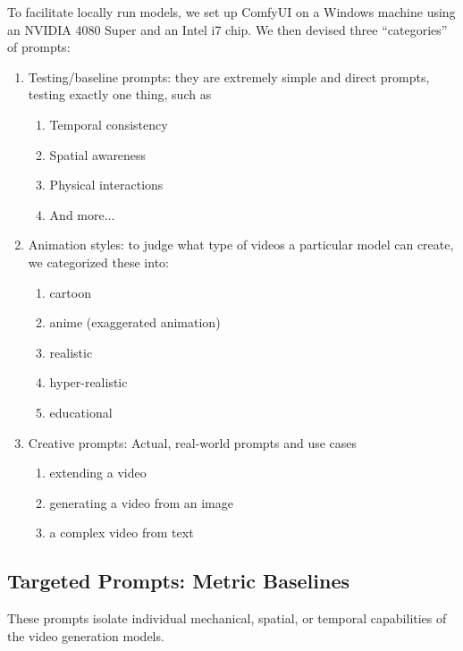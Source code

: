 \documentclass[sigconf]{acmart}
\begin{document}
To facilitate locally run models, we set up ComfyUI on a Windows machine using an NVIDIA 4080 Super and an Intel i7 chip. We then devised three ``categories'' of prompts:
\begin{enumerate}
    \item Testing/baseline prompts: they are extremely simple and direct prompts, testing exactly one thing, such as \begin{enumerate}
              \item Temporal consistency
              \item Spatial awareness
              \item Physical interactions
              \item And more...
          \end{enumerate}
    \item Animation styles: to judge what type of videos a particular model can create, we categorized these into:
          \begin{enumerate}
              \item cartoon
              \item anime (exaggerated animation)
              \item realistic
              \item hyper-realistic
              \item educational
          \end{enumerate}
    \item Creative prompts: Actual, real-world prompts and use cases
          \begin{enumerate}
              \item extending a video
              \item generating a video from an image
              \item a complex video from text
          \end{enumerate}
\end{enumerate}

\subsection{Targeted Prompts: Metric Baselines}
These prompts isolate individual mechanical, spatial, or temporal capabilities of the video generation models.
\end{document}

